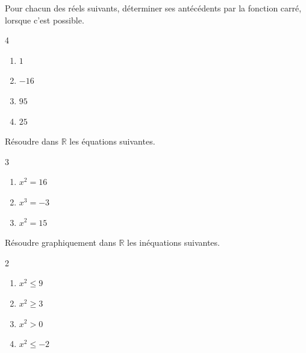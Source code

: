 \exo
Pour chacun des réels suivants, déterminer ses antécédents par la fonction carré, lorsque c'est possible.
\setlength{\columnseprule}{0pt}
\begin{multicols}{4}
\begin{enumerate}
\item $1$
\item $-16$
\item $95$
\item $25$
\end{enumerate}
\end{multicols}

\exo
Résoudre dans $\mathbb{R}$ les équations suivantes.
\begin{multicols}{3}
\begin{enumerate}
\item $x^2=16$
\item $x^3=-3$
\item $x^2=15$
\end{enumerate}
\end{multicols}

\exo
Résoudre graphiquement dans $\mathbb{R}$ les inéquations suivantes.
\begin{multicols}{2}
\begin{enumerate}
\item $x^2\leq 9$
\item $x^2\geq 3$
\item $x^2>0$
\item $x^2\leq -2$
\end{enumerate}
\end{multicols}
